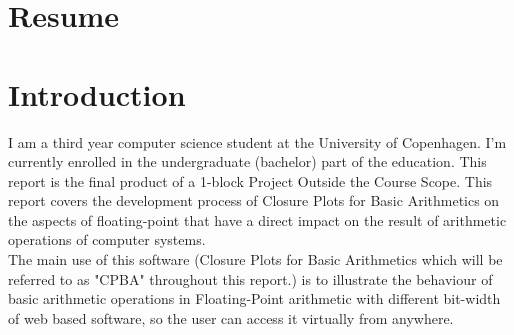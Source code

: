 \documentclass[11pt]{article}
\begin{document}
\section*{Resume}

\newpage
\begin{center}
\tableofcontents
\end{center}

\newpage
\section{Introduction}
I am a third year computer science student at the University of Copenhagen. I'm currently enrolled in the undergraduate (bachelor) part of the education. This report is the final product of a 1-block Project Outside the Course Scope. This report covers the development process of Closure Plots for Basic Arithmetics on the aspects of floating-point that have a direct impact on the result of arithmetic operations of computer systems.\\

The main use of this software (Closure Plots for Basic Arithmetics which will be referred to as "CPBA" throughout this report.) is to illustrate the behaviour of basic arithmetic operations in Floating-Point arithmetic with different bit-width of web based software, so the user can access it virtually from anywhere.\\
\end{document}
